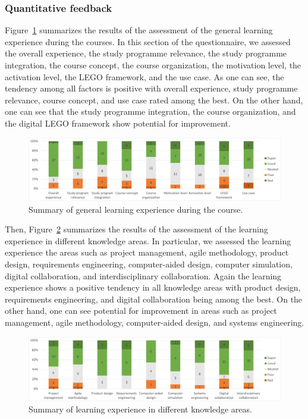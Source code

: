 \documentclass{PDS}
\begin{document}
\subsubsection{Quantitative feedback}
\label{sec:quantitative}

Figure~\ref{fig:after-general} summarizes the results of the assessment of the general learning experience during the courses.
In this section of the questionnaire, we assessed the overall experience, the study programme relevance, the study programme integration, the course concept, the course organization, the motivation level, the activation level, the LEGO framework, and the use case.
As one can see, the tendency among all factors is positive with overall experience, study programme relevance, course concept, and use case rated among the best.
On the other hand, one can see that the study programme integration, the course organization, and the digital LEGO framework show potential for improvement.

\begin{figure}[htbp]
    \centering
    \includegraphics[width=\textwidth]{./diagrams/after-general.png}
    \caption{Summary of general learning experience during the course.}
    \label{fig:after-general}
\end{figure}

Then, Figure~\ref{fig:after-knowledge} summarizes the results of the assessment of the learning experience in different knowledge areas.
In particular, we assessed the learning experience the areas such as project management, agile methodology, product design, requirements engineering, computer-aided design, computer simulation, digital collaboration, and interdisciplinary collaboration.
Again the learning experience shows a positive tendency in all knowledge areas with product design, requirements engineering, and digital collaboration being among the best.
On the other hand, one can see potential for improvement in areas such as project management, agile methodology, computer-aided design, and systems engineering.

\begin{figure}[htbp]
    \centering
    \includegraphics[width=\textwidth]{./diagrams/after-knowledge.png}
    \caption{Summary of learning experience in different knowledge areas.}
    \label{fig:after-knowledge}
\end{figure}
\end{document}
